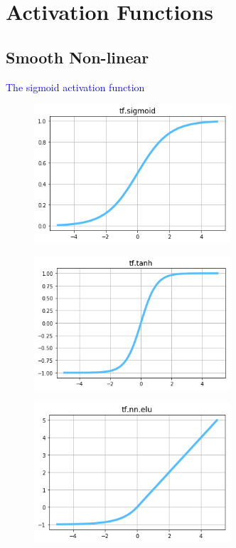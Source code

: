 \section{Activation Functions}

\subsection{Smooth Non-linear}

\textcolor{blue}{The sigmoid activation function}

\begin{figure}
\centering
\includegraphics[width=0.65\textwidth]{./sync_imgs/act/smooth/sigmoid.png}
\label{fig:act_smooth_sigmoid}
\end{figure}

\begin{figure}
\centering
\includegraphics[width=0.65\textwidth]{./sync_imgs/act/smooth/tangent.png}
\label{fig:act_smooth_tangent}
\end{figure}

\begin{figure}
\centering
\includegraphics[width=0.65\textwidth]{./sync_imgs/act/smooth/elu.png}
\label{fig:act_smooth_elu}
\end{figure}

